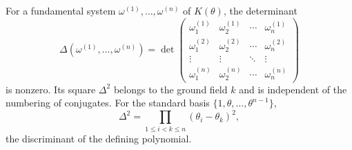 For a fundamental system $\omega^{(1)}, \ldots, \omega^{(n)}$ of $K(\theta)$, the determinant
$$\Delta(\omega^{(1)}, \ldots, \omega^{(n)}) = \det\begin{pmatrix}
\omega_1^{(1)} & \omega_2^{(1)} & \cdots & \omega_n^{(1)} \\
\omega_1^{(2)} & \omega_2^{(2)} & \cdots & \omega_n^{(2)} \\
\vdots & \vdots & \ddots & \vdots \\
\omega_1^{(n)} & \omega_2^{(n)} & \cdots & \omega_n^{(n)}
\end{pmatrix}$$
is nonzero. Its square $\Delta^2$ belongs to the ground field $k$ and is independent of the numbering of conjugates. For the standard basis $\{1, \theta, \ldots, \theta^{n-1}\}$,
$$\Delta^2 = \prod_{1 \leq i < k \leq n} (\theta_i - \theta_k)^2,$$
the discriminant of the defining polynomial.
